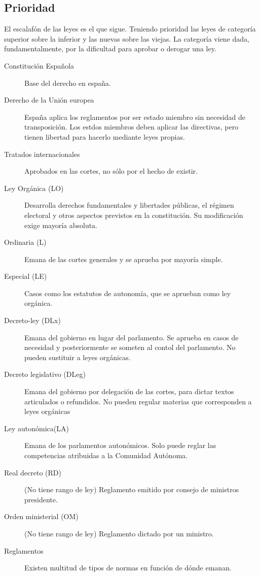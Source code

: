 \subsection{Prioridad}
    El escalafón de las leyes es el que sigue. Teniendo prioridad las leyes de categoría superior sobre la inferior y las nuevas sobre las viejas. La categoría viene dada, fundamentalmente, por la dificultad para aprobar o derogar una ley.
    \begin{description}
        \item[Constitución Española] Base del derecho en españa.
        \item[Derecho de la Unión europea] España aplica los reglamentos por ser estado miembro sin necesidad de transposición. Los estdos miembros deben aplicar las directivas, pero tienen libertad para hacerlo mediante leyes propias.
        \item[Tratados internacionales] Aprobados en las cortes, no sólo por el hecho de existir.
        \item[Ley Orgánica (LO) ] Desarrolla derechos fundamentales y libertades públicas, el régimen electoral y otros aspectos previstos en la constitución. Su modificación exige mayoría absoluta.
        \item[Ordinaria (L)] Emana de las cortes generales y se aprueba por mayoría simple.
        \item[Especial (LE)] Casos como los estatutos de autonomía, que se aprueban como ley orgánica.
        \item[Decreto-ley (DLx)] Emana del gobierno en lugar del parlamento. Se aprueba en casos de necesidad y posteriormente se someten al contol del parlamento. No pueden sustituir a leyes orgánicas.
        \item[Decreto legislativo (DLeg)] Emana del gobierno por delegación de las cortes, para dictar textos articulados o refundidos. No pueden regular materias que corresponden a leyes orgánicas
        \item[Ley autonómica(LA)] Emana de los parlamentos autonómicos. Solo puede reglar las competencias atribuidas a la Comunidad Autónoma.
        \item[Real decreto (RD)] (No tiene rango de ley) Reglamento emitido por consejo de ministros  presidente.
        \item[Orden ministerial (OM)] (No tiene rango de ley) Reglamento dictado por un ministro.
        \item[Reglamentos] Existen multitud de tipos de normas en función de dónde emanan.
    \end{description}

